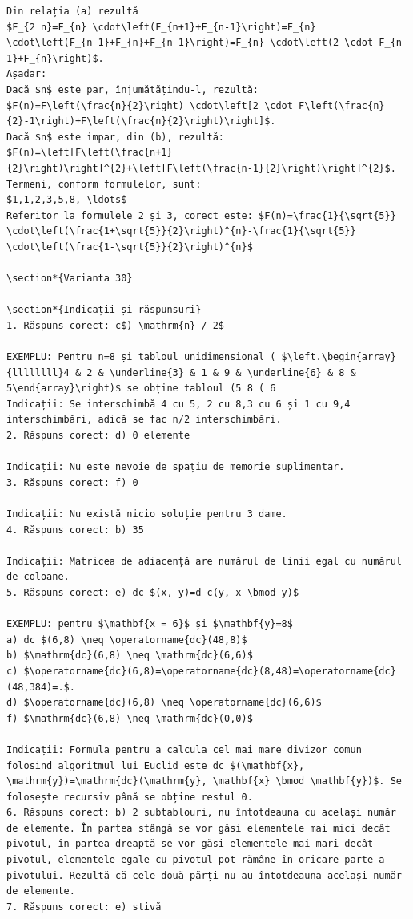 \documentclass[10pt]{article}
\begin{document}
\begin{verbatim}
Din relația (a) rezultă
$F_{2 n}=F_{n} \cdot\left(F_{n+1}+F_{n-1}\right)=F_{n} \cdot\left(F_{n-1}+F_{n}+F_{n-1}\right)=F_{n} \cdot\left(2 \cdot F_{n-1}+F_{n}\right)$.
Așadar:
Dacă $n$ este par, înjumătățindu-l, rezultă:
$F(n)=F\left(\frac{n}{2}\right) \cdot\left[2 \cdot F\left(\frac{n}{2}-1\right)+F\left(\frac{n}{2}\right)\right]$.
Dacă $n$ este impar, din (b), rezultă:
$F(n)=\left[F\left(\frac{n+1}{2}\right)\right]^{2}+\left[F\left(\frac{n-1}{2}\right)\right]^{2}$.
Termeni, conform formulelor, sunt:
$1,1,2,3,5,8, \ldots$
Referitor la formulele 2 și 3, corect este: $F(n)=\frac{1}{\sqrt{5}} \cdot\left(\frac{1+\sqrt{5}}{2}\right)^{n}-\frac{1}{\sqrt{5}} \cdot\left(\frac{1-\sqrt{5}}{2}\right)^{n}$

\section*{Varianta 30}

\section*{Indicații și răspunsuri}
1. Răspuns corect: c$) \mathrm{n} / 2$

EXEMPLU: Pentru n=8 și tabloul unidimensional ( $\left.\begin{array}{llllllll}4 & 2 & \underline{3} & 1 & 9 & \underline{6} & 8 & 5\end{array}\right)$ se obține tabloul (5 8 ( 6
Indicații: Se interschimbă 4 cu 5, 2 cu 8,3 cu 6 și 1 cu 9,4 interschimbări, adică se fac n/2 interschimbări.
2. Răspuns corect: d) 0 elemente

Indicații: Nu este nevoie de spațiu de memorie suplimentar.
3. Răspuns corect: f) 0

Indicații: Nu există nicio soluție pentru 3 dame.
4. Răspuns corect: b) 35

Indicații: Matricea de adiacență are numărul de linii egal cu numărul de coloane.
5. Răspuns corect: e) dc $(x, y)=d c(y, x \bmod y)$

EXEMPLU: pentru $\mathbf{x = 6}$ și $\mathbf{y}=8$
a) dc $(6,8) \neq \operatorname{dc}(48,8)$
b) $\mathrm{dc}(6,8) \neq \mathrm{dc}(6,6)$
c) $\operatorname{dc}(6,8)=\operatorname{dc}(8,48)=\operatorname{dc}(48,384)=.$.
d) $\operatorname{dc}(6,8) \neq \operatorname{dc}(6,6)$
f) $\mathrm{dc}(6,8) \neq \mathrm{dc}(0,0)$

Indicații: Formula pentru a calcula cel mai mare divizor comun folosind algoritmul lui Euclid este dc $(\mathbf{x}, \mathrm{y})=\mathrm{dc}(\mathrm{y}, \mathbf{x} \bmod \mathbf{y})$. Se folosește recursiv până se obține restul 0.
6. Răspuns corect: b) 2 subtablouri, nu întotdeauna cu același număr de elemente. În partea stângă se vor găsi elementele mai mici decât pivotul, în partea dreaptă se vor găsi elementele mai mari decât pivotul, elementele egale cu pivotul pot rămâne în oricare parte a pivotului. Rezultă că cele două părți nu au întotdeauna același număr de elemente.
7. Răspuns corect: e) stivă


\end{verbatim}
\end{document}
